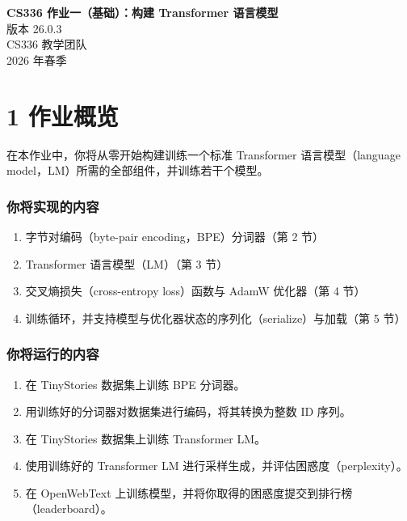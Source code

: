 
\begin{center}
  {\LARGE\bfseries CS336 作业一（基础）：构建 Transformer 语言模型}\\[1.2ex]
  {\normalsize 版本 26.0.3}\\[0.4ex]
  {\normalsize CS336 教学团队}\\[0.4ex]
  {\normalsize 2026 年春季}
\end{center}

\vspace{1.2em}

\section*{1 作业概览}

在本作业中，你将从零开始构建训练一个标准 Transformer 语言模型（language model，LM）所需的全部组件，并训练若干个模型。

\subsubsection*{你将实现的内容}

\begin{enumerate}[leftmargin=2.2em]
  \item 字节对编码（byte-pair encoding，BPE）分词器（第 2 节）
  \item Transformer 语言模型（LM）（第 3 节）
  \item 交叉熵损失（cross-entropy loss）函数与 AdamW 优化器（第 4 节）
  \item 训练循环，并支持模型与优化器状态的序列化（serialize）与加载（第 5 节）
\end{enumerate}

\subsubsection*{你将运行的内容}

\begin{enumerate}[leftmargin=2.2em]
  \item 在 TinyStories 数据集上训练 BPE 分词器。
  \item 用训练好的分词器对数据集进行编码，将其转换为整数 ID 序列。
  \item 在 TinyStories 数据集上训练 Transformer LM。
  \item 使用训练好的 Transformer LM 进行采样生成，并评估困惑度（perplexity）。
  \item 在 OpenWebText 上训练模型，并将你取得的困惑度提交到排行榜（leaderboard）。
\end{enumerate}

